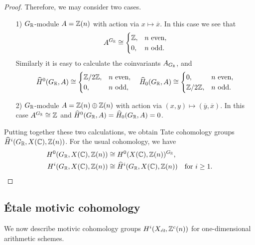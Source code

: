 \documentclass{article}
\numberwithin{equation}{section}
\begin{document}
\begin{proposition}
\begin{proof}
    Therefore, we may consider two cases.
    \begin{enumerate}
    \item[1)] $G_\RR$-module $A = \ZZ (n)$ with action via
      $x \mapsto \overline{x}$.  In this case we see that
      \[ A^{G_\RR} \cong
        \begin{cases}
          \ZZ, & n\text{ even}, \\
          0, & n\text{ odd}.
        \end{cases} \]
      Similarly it is easy to calculate the coinvariants $A_{G_\RR}$, and
      \[ \widehat{H}^0 (G_\RR, A) \cong
        \begin{cases}
          \ZZ/2\ZZ, & n\text{ even},\\
          0, & n\text{ odd},
        \end{cases} \quad
        \widehat{H}_0 (G_\RR, A) \cong
        \begin{cases}
          0, & n\text{ even},\\
          \ZZ/2\ZZ, & n\text{ odd}.
        \end{cases} \]

    \item[2)] $G_\RR$-module $A = \ZZ (n) \oplus \ZZ (n)$ with action via
      $(x,y) \mapsto (\overline{y}, \overline{x})$. In this case
      $A^{G_\RR} \cong \ZZ$ and
      $\widehat{H}^0 (G_\RR,A) = \widehat{H}_0 (G_\RR,A) = 0$.
    \end{enumerate}

    Putting together these two calculations, we obtain Tate cohomology groups
    $\widehat{H}^i (G_\RR, X (\CC), \ZZ (n))$. For the usual cohomology, we have
    \begin{align*}
      H^0 (G_\RR, X (\CC), \ZZ (n)) & \cong H^0 (X (\CC), \ZZ (n))^{G_\RR}, \\
      H^i (G_\RR, X (\CC), \ZZ (n)) & \cong \widehat{H}^i (G_\RR, X (\CC), \ZZ (n)) \quad \text{for }i \ge 1. \qedhere
    \end{align*}
  \end{proof}
\end{proposition}

\subsection*{Étale motivic cohomology}

We now describe motivic cohomology groups $H^i (X_\et, \ZZ^c (n))$ for
one-dimensional arithmetic schemes.
\end{document}
